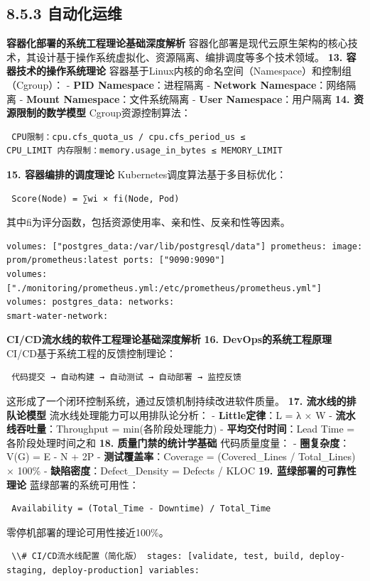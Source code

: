 {\subsection{8.5.3 自动化运维}\label{ux81eaux52a8ux5316ux8fd0ux7ef4} \textbf{容器化部署的系统工程理论基础深度解析}
容器化部署是现代云原生架构的核心技术，其设计基于操作系统虚拟化、资源隔离、编排调度等多个技术领域。 \textbf{13. 容器技术的操作系统理论} 容器基于Linux内核的命名空间（Namespace）和控制组（Cgroup）： -
\textbf{PID Namespace}：进程隔离 - \textbf{Network Namespace}：网络隔离 - \textbf{Mount Namespace}：文件系统隔离 - \textbf{User
Namespace}：用户隔离 \textbf{14. 资源限制的数学模型} Cgroup资源控制算法： \begin{lstlisting} CPU限制：cpu.cfs_quota_us / cpu.cfs_period_us ≤
CPU_LIMIT 内存限制：memory.usage_in_bytes ≤ MEMORY_LIMIT \end{lstlisting} \textbf{15. 容器编排的调度理论} Kubernetes调度算法基于多目标优化：
\begin{lstlisting} Score(Node) = ∑wi × fi(Node, Pod) \end{lstlisting} 其中fi为评分函数，包括资源使用率、亲和性、反亲和性等因素。 \begin{lstlisting}
volumes: ["postgres_data:/var/lib/postgresql/data"] prometheus: image: prom/prometheus:latest ports: ["9090:9090"]
volumes: ["./monitoring/prometheus.yml:/etc/prometheus/prometheus.yml"] volumes: postgres_data: networks:
smart-water-network: \end{lstlisting} \textbf{CI/CD流水线的软件工程理论基础深度解析} \textbf{16. DevOps的系统工程原理} CI/CD基于系统工程的反馈控制理论：
\begin{lstlisting} 代码提交 → 自动构建 → 自动测试 → 自动部署 → 监控反馈 \end{lstlisting} 这形成了一个闭环控制系统，通过反馈机制持续改进软件质量。 \textbf{17. 流水线的排队论模型}
流水线处理能力可以用排队论分析： - \textbf{Little定律}：L = λ × W - \textbf{流水线吞吐量}：Throughput = min(各阶段处理能力) - \textbf{平均交付时间}：Lead Time =
各阶段处理时间之和 \textbf{18. 质量门禁的统计学基础} 代码质量度量： - \textbf{圈复杂度}：V(G) = E - N + 2P - \textbf{测试覆盖率}：Coverage = (Covered\_Lines
/ Total\_Lines) × 100\% - \textbf{缺陷密度}：Defect\_Density = Defects / KLOC \textbf{19. 蓝绿部署的可靠性理论} 蓝绿部署的系统可用性：
\begin{lstlisting} Availability = (Total_Time - Downtime) / Total_Time \end{lstlisting} 零停机部署的理论可用性接近100\%。
\begin{lstlisting} \\# CI/CD流水线配置（简化版） stages: [validate, test, build, deploy-staging, deploy-production] variables:

\end{lstlisting}}
